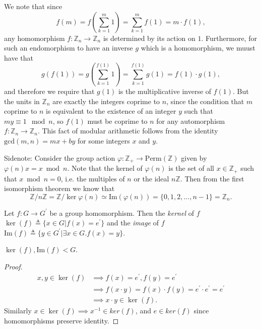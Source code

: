 \begin{Answer}
We note that since
$$
f(m) = f\left(\sum_{k=1}^m 1\right) = \sum_{k=1}^m f(1) = m \cdot f(1),
$$
any homomorphism $f : \mathbb{Z}_n \to \mathbb{Z}_n$ is determined by
its action on $1$. Furthermore, for such an endomorphism to have an
inverse $g$ which is a homomorphism, we muust have that
$$
g(f(1)) = g\left(\sum_{k=1}^{f(1)} 1\right)
        = \sum_{k=1}^{f(1)} g(1)
        = f(1) \cdot g(1),
$$
and therefore we require that $g(1)$ is the multiplicative inverse of
$f(1)$. But the units in $\mathbb{Z}_n$ are exactly the integers
coprime to $n$, since the condition that $m$ coprime to $n$ is
equivalent to the existence of an integer $y$ such that $my \equiv 1
\mod n$,
so $f(1)$ must be coprime to $n$ for any automorphism
$f : \mathbb{Z}_n \to \mathbb{Z}_n$. This fact of modular arithmetic
follows from the identity $\mathrm{gcd}(m, n) = mx + by$ for some
integers $x$ and $y$.

Sidenote: Consider the group action
$\varphi : \mathbb{Z}_+ \to \mathrm{Perm}(\mathbb{Z})$ given by
$\varphi(n) x = x \bmod n$. Note that the kernel of $\varphi(n)$
is the set of all $x \in \mathbb{Z}_+$ such that $x \bmod n = 0$,
i.e. the multiples of $n$ or the ideal $n \mathbb{Z}$. Then from the
first isomorphism theorem we know that
$$
\mathbb{Z} / n \mathbb{Z}
=      \mathbb{Z} / \ker \varphi(n)
\simeq \mathrm{Im} (\varphi(n))
=      \{0, 1, 2, \dots, n-1\}
=      \mathbb{Z}_n.
$$
\end{Answer}

\begin{defn}
Let $f: G \to G^\prime$ be a group homomorphism. Then the \emph{kernel} of
$f$ $\ker(f) \triangleq \{ x \in G | f(x) = e^\prime \}$ and the \emph{image} of $f$
$\mathrm{Im}(f) \triangleq \{ y \in G^\prime | \exists x \in G . f(x) = y \}$.
\end{defn}

\begin{prop}
$\ker(f), \mathrm{Im}(f) < G$.
\end{prop}
\begin{proof}
\begin{align*}
  x, y \in \ker(f)
    & \implies f(x) = e^\prime, f(y) = e^\prime \\
    & \implies f(x \cdot y) = f(x) \cdot f(y)
                            = e^\prime \cdot e^\prime
                            = e^\prime          \\
    & \implies x \cdot y \in \ker(f).
\end{align*}
Similarly $x \in \ker(f) \implies x^{-1} \in ker(f)$,
and $e \in ker(f)$ since homomorphisms preserve identity.
\end{proof}

